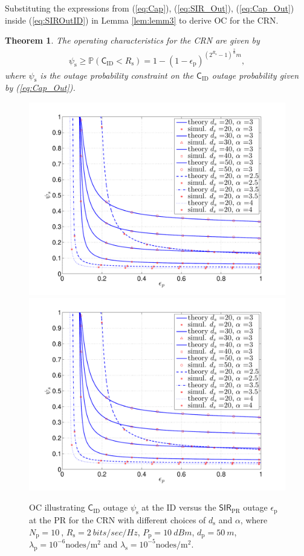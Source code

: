 \documentclass[conference, twocolumn]{IEEEtran}
\newcommand{\p}{\mathbb P}
\newcommand{\sub}[1]{_{\text{#1}}}
\newtheorem{theorem}{Theorem}
\begin{document}
Substituting the expressions from (\ref{eq:Cap}), (\ref{eq:SIR_Out}), (\ref{eq:Cap_Out}) inside (\ref{eq:SIROutID}) in Lemma \ref{lem:lemm3} to derive OC for the CRN. 
\begin{theorem} \label{th:theo1}
\normalfont
The operating characteristics for the CRN are given by  
\begin{align}
\psi\sub{s} \ge \p(\mathsf{C}_{\text{ID}} < R\sub{s}) = 1 - \left(1 - \epsilon{\sub{p}}\right)^{ \left( 2^{R\sub{s}}-1 \right)^{\frac{2}{\alpha}} m }, 
\label{eq:OC} 
\end{align}
where $\psi\sub{s}$ is the outage probability constraint on the $\textsf{C}\sub{ID}$ outage probability given by (\ref{eq:Cap_Out}). 
\end{theorem}
\begin{figure}[!t]
\makeatletter
\if@twocolumn
        \includegraphics[trim=1.2cm 0.4cm 1.6cm 1.2cm,clip=true,width=\columnwidth]{figures/fig_ID_Cap_Out_vs_epsilon_wkr_1e5.pdf}
        \else
        \includegraphics[trim=0.0cm 0.0cm 0.0cm 0.0cm,clip=true,width=0.5 \columnwidth]{figures/fig_ID_Cap_Out_vs_epsilon_wkr_1e5.pdf}
        \fi
\makeatother
\caption{OC illustrating $\mathsf{C}\sub{ID}$ outage $\psi\sub{s}$ at the ID versus the $\mathsf{SIR}\sub{PR}$ outage $\epsilon\sub{p}$ at the PR for the CRN with different choices of $d\sub{s}$ and $\alpha$, where $N\sub{p} = \SI{10}{}$, $R\sub{s} = \SI{2}{bits/sec/Hz}$, $P\sub{p} = \SI{10}{dBm}$, $d\sub{p} = \SI{50}{m}$, $\lambda\sub{p} = 10^{-6} \text{nodes}/{\text{m}^2}$ and $\lambda\sub{s} = 10^{-5} \text{nodes}/{\text{m}^2}$.}
\label{fig:ID_OC}
\end{figure}
\end{document}
